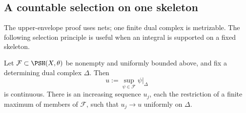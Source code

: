 \subsection{A countable selection on one skeleton}
\label{sec:ch23-fixed-skeleton-selection}

The upper-envelope proof uses nets; one finite dual complex is metrizable.
The following selection principle is useful when an integral is supported
on a fixed skeleton.

\begin{proposition}\label{prop:ch23-fixed-skeleton-selection}
Let $\mathcal F\subset\PSH(X,\theta)$ be nonempty and uniformly bounded
above, and fix a determining dual complex $\Delta$.  Then
\begin{equation}\label{eq:ch23-fixed-skeleton-sup}
                    u:=\sup_{\psi\in\mathcal F}\psi|_\Delta
\end{equation}
is continuous.  There is an increasing sequence $u_j$, each the
restriction of a finite maximum of members of $\mathcal F$, such that
$u_j\to u$ uniformly on $\Delta$.
\end{proposition}

